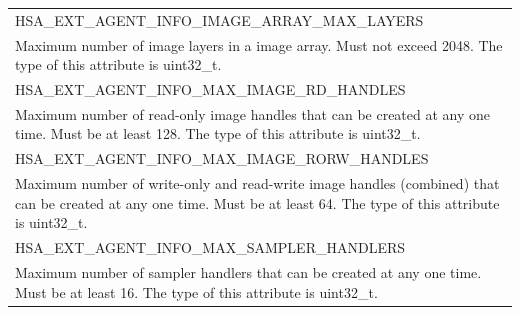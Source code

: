 \documentclass[final,oneside]{book}
\newcommand{\reftyp}[1]{#1}
\newcommand{\refenu}[1]{\reftyp{#1}}
\begin{document}
\begin{longtable}{@{\hspace{2em}}p{\linewidth-2em}}
\hspace{-2em}\refenu{HSA_\-EXT_\-AGENT_\-INFO_\-IMAGE_\-ARRAY_\-MAX_\-LAYERS}\\Maximum number of image layers in a image array. Must not exceed 2048. The type of this attribute is uint32_\-t.\\[2mm]
\hspace{-2em}\refenu{HSA_\-EXT_\-AGENT_\-INFO_\-MAX_\-IMAGE_\-RD_\-HANDLES}\\Maximum number of read-only image handles that can be created at any one time. Must be at least 128. The type of this attribute is uint32_\-t.\\[2mm]
\hspace{-2em}\refenu{HSA_\-EXT_\-AGENT_\-INFO_\-MAX_\-IMAGE_\-RORW_\-HANDLES}\\Maximum number of write-only and read-write image handles (combined) that can be created at any one time. Must be at least 64. The type of this attribute is uint32_\-t.\\[2mm]
\hspace{-2em}\refenu{HSA_\-EXT_\-AGENT_\-INFO_\-MAX_\-SAMPLER_\-HANDLERS}\\Maximum number of sampler handlers that can be created at any one time. Must be at least 16. The type of this attribute is uint32_\-t.
\end{longtable} 
\end{document}
